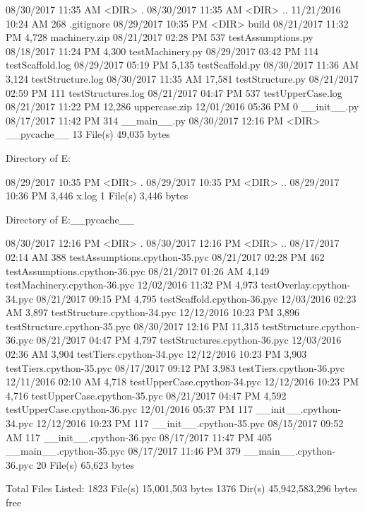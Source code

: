 08/30/2017  11:35 AM    <DIR>          .
08/30/2017  11:35 AM    <DIR>          ..
11/21/2016  10:24 AM               268 .gitignore
08/29/2017  10:35 PM    <DIR>          build
08/21/2017  11:32 PM             4,728 machinery.zip
08/21/2017  02:28 PM               537 testAssumptions.py
08/18/2017  11:24 PM             4,300 testMachinery.py
08/29/2017  03:42 PM               114 testScaffold.log
08/29/2017  05:19 PM             5,135 testScaffold.py
08/30/2017  11:36 AM             3,124 testStructure.log
08/30/2017  11:35 AM            17,581 testStructure.py
08/21/2017  02:59 PM               111 testStructures.log
08/21/2017  04:47 PM               537 testUpperCase.log
08/21/2017  11:22 PM            12,286 uppercase.zip
12/01/2016  05:36 PM                 0 __init__.py
08/17/2017  11:42 PM               314 __main__.py
08/30/2017  12:16 PM    <DIR>          __pycache__
              13 File(s)         49,035 bytes

 Directory of E:\Python\apeman\tests\build

08/29/2017  10:35 PM    <DIR>          .
08/29/2017  10:35 PM    <DIR>          ..
08/29/2017  10:36 PM             3,446 x.log
               1 File(s)          3,446 bytes

 Directory of E:\Python\apeman\tests\__pycache__

08/30/2017  12:16 PM    <DIR>          .
08/30/2017  12:16 PM    <DIR>          ..
08/17/2017  02:14 AM               388 testAssumptions.cpython-35.pyc
08/21/2017  02:28 PM               462 testAssumptions.cpython-36.pyc
08/21/2017  01:26 AM             4,149 testMachinery.cpython-36.pyc
12/02/2016  11:32 PM             4,973 testOverlay.cpython-34.pyc
08/21/2017  09:15 PM             4,795 testScaffold.cpython-36.pyc
12/03/2016  02:23 AM             3,897 testStructure.cpython-34.pyc
12/12/2016  10:23 PM             3,896 testStructure.cpython-35.pyc
08/30/2017  12:16 PM            11,315 testStructure.cpython-36.pyc
08/21/2017  04:47 PM             4,797 testStructures.cpython-36.pyc
12/03/2016  02:36 AM             3,904 testTiers.cpython-34.pyc
12/12/2016  10:23 PM             3,903 testTiers.cpython-35.pyc
08/17/2017  09:12 PM             3,983 testTiers.cpython-36.pyc
12/11/2016  02:10 AM             4,718 testUpperCase.cpython-34.pyc
12/12/2016  10:23 PM             4,716 testUpperCase.cpython-35.pyc
08/21/2017  04:47 PM             4,592 testUpperCase.cpython-36.pyc
12/01/2016  05:37 PM               117 __init__.cpython-34.pyc
12/12/2016  10:23 PM               117 __init__.cpython-35.pyc
08/15/2017  09:52 AM               117 __init__.cpython-36.pyc
08/17/2017  11:47 PM               405 __main__.cpython-35.pyc
08/17/2017  11:46 PM               379 __main__.cpython-36.pyc
              20 File(s)         65,623 bytes

     Total Files Listed:
            1823 File(s)     15,001,503 bytes
            1376 Dir(s)  45,942,583,296 bytes free
